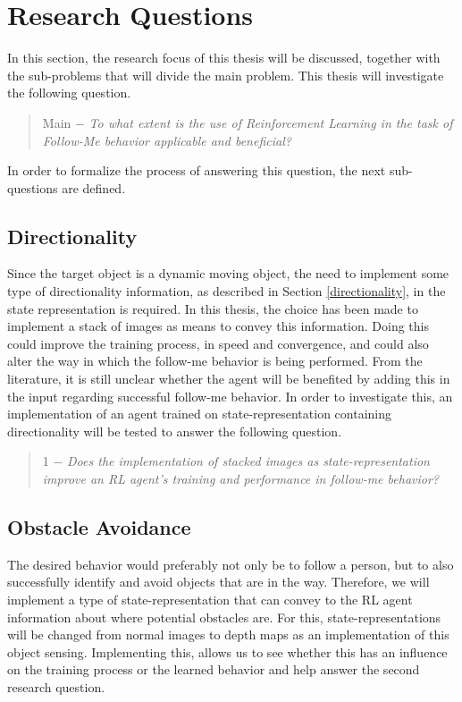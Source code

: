 \section{Research Questions} \label{RQs}
In this section, the research focus of this thesis will be discussed, together 
with the sub-problems that will divide the main problem. This thesis will 
investigate the following question. 

\begin{quote}
    \label{mainresearch}
    Main $-$ \textit{To what extent is the use of Reinforcement Learning in the task 
    of Follow-Me behavior applicable and beneficial?}
\end{quote}

\noindent In order to formalize the 
process of answering this question, the next sub-questions are defined.

\subsection{Directionality}
Since the target object is a dynamic moving object, the need to implement some type 
of directionality information, as described in Section \ref{directionality}, in 
the state representation is required. In this thesis, the choice has been made to 
implement a stack of images as means to convey this information.
Doing this could improve the training process, in speed and convergence, and could 
also alter the way in which the follow-me behavior is being performed. From the 
literature, it is still 
unclear whether the agent will be benefited by adding this in the input regarding 
successful follow-me behavior. In order to investigate this, an implementation 
of an agent trained on state-representation containing directionality will be tested 
to answer the following question. 

\begin{quote}
    \label{research1}
    1 $-$ \textit{Does the implementation of stacked images as state-representation improve 
    an RL agent's training and performance in follow-me behavior?}
\end{quote}

\subsection{Obstacle Avoidance}
The desired behavior would preferably not only be to follow a person, but to also 
successfully identify and avoid objects that are in the way. Therefore, we will 
implement a type of state-representation that can convey to the RL agent information 
about where potential obstacles are. For this, state-representations will be changed from 
normal images to depth maps as an implementation of this object sensing. Implementing this, 
allows us to see whether this has 
an influence on the training process or the learned behavior and help answer the second 
research question. 

